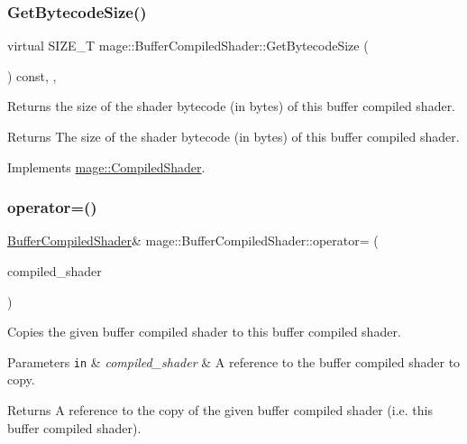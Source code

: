\subsubsection{\texorpdfstring{Get\+Bytecode\+Size()}{GetBytecodeSize()}}
{\footnotesize\ttfamily virtual S\+I\+Z\+E\+\_\+T mage\+::\+Buffer\+Compiled\+Shader\+::\+Get\+Bytecode\+Size (\begin{DoxyParamCaption}{ }\end{DoxyParamCaption}) const\hspace{0.3cm}{\ttfamily [override]}, {\ttfamily [virtual]}, {\ttfamily [noexcept]}}

Returns the size of the shader bytecode (in bytes) of this buffer compiled shader.

\begin{DoxyReturn}{Returns}
The size of the shader bytecode (in bytes) of this buffer compiled shader. 
\end{DoxyReturn}


Implements \hyperlink{structmage_1_1_compiled_shader_ae9dbc3c205d54cc89b9b0746b76b157b}{mage\+::\+Compiled\+Shader}.

\hypertarget{structmage_1_1_buffer_compiled_shader_ab264c24731dc03799e8620edd378b26a}{}\label{structmage_1_1_buffer_compiled_shader_ab264c24731dc03799e8620edd378b26a} 
\subsubsection{\texorpdfstring{operator=()}{operator=()}\hspace{0.1cm}{\footnotesize\ttfamily [1/2]}}
{\footnotesize\ttfamily \hyperlink{structmage_1_1_buffer_compiled_shader}{Buffer\+Compiled\+Shader}\& mage\+::\+Buffer\+Compiled\+Shader\+::operator= (\begin{DoxyParamCaption}\item[{const \hyperlink{structmage_1_1_buffer_compiled_shader}{Buffer\+Compiled\+Shader} \&}]{compiled\+\_\+shader }\end{DoxyParamCaption})\hspace{0.3cm}{\ttfamily [delete]}}

Copies the given buffer compiled shader to this buffer compiled shader.


\begin{DoxyParams}[1]{Parameters}
\mbox{\tt in}  & {\em compiled\+\_\+shader} & A reference to the buffer compiled shader to copy. \\
\hline
\end{DoxyParams}
\begin{DoxyReturn}{Returns}
A reference to the copy of the given buffer compiled shader (i.\+e. this buffer compiled shader). 
\end{DoxyReturn}
\hypertarget{structmage_1_1_buffer_compiled_shader_a4894525a724a0de0228da66494fe9a3e}{}\label{structmage_1_1_buffer_compiled_shader_a4894525a724a0de0228da66494fe9a3e} 
